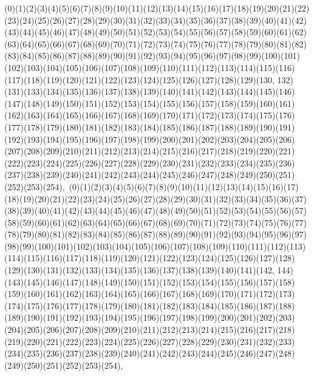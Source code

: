 \documentclass[12pt]{article}
\begin{document}
{(0)(1)(2)(3)(4)(5)(6)(7)(8)(9)(10)(11)(12)(13)(14)(15)(16)(17)(18)(19)(20)(21)(22)(23)(24)(25)(26)(27)(28)(29)(30)(31)(32)(33)(34)(35)(36)(37)(38)(39)(40)(41)(42)(43)(44)(45)(46)(47)(48)(49)(50)(51)(52)(53)(54)(55)(56)(57)(58)(59)(60)(61)(62)(63)(64)(65)(66)(67)(68)(69)(70)(71)(72)(73)(74)(75)(76)(77)(78)(79)(80)(81)(82)(83)(84)(85)(86)(87)(88)(89)(90)(91)(92)(93)(94)(95)(96)(97)(98)(99)(100)(101)(102)(103)(104)(105)(106)(107)(108)(109)(110)(111)(112)(113)(114)(115)(116)(117)(118)(119)(120)(121)(122)(123)(124)(125)(126)(127)(128)(129)(130, 132)(131)(133)(134)(135)(136)(137)(138)(139)(140)(141)(142)(143)(144)(145)(146)(147)(148)(149)(150)(151)(152)(153)(154)(155)(156)(157)(158)(159)(160)(161)(162)(163)(164)(165)(166)(167)(168)(169)(170)(171)(172)(173)(174)(175)(176)(177)(178)(179)(180)(181)(182)(183)(184)(185)(186)(187)(188)(189)(190)(191)(192)(193)(194)(195)(196)(197)(198)(199)(200)(201)(202)(203)(204)(205)(206)(207)(208)(209)(210)(211)(212)(213)(214)(215)(216)(217)(218)(219)(220)(221)(222)(223)(224)(225)(226)(227)(228)(229)(230)(231)(232)(233)(234)(235)(236)(237)(238)(239)(240)(241)(242)(243)(244)(245)(246)(247)(248)(249)(250)(251)(252)(253)(254)$
, 
$
(0)(1)(2)(3)(4)(5)(6)(7)(8)(9)(10)(11)(12)(13)(14)(15)(16)(17)(18)(19)(20)(21)(22)(23)(24)(25)(26)(27)(28)(29)(30)(31)(32)(33)(34)(35)(36)(37)(38)(39)(40)(41)(42)(43)(44)(45)(46)(47)(48)(49)(50)(51)(52)(53)(54)(55)(56)(57)(58)(59)(60)(61)(62)(63)(64)(65)(66)(67)(68)(69)(70)(71)(72)(73)(74)(75)(76)(77)(78)(79)(80)(81)(82)(83)(84)(85)(86)(87)(88)(89)(90)(91)(92)(93)(94)(95)(96)(97)(98)(99)(100)(101)(102)(103)(104)(105)(106)(107)(108)(109)(110)(111)(112)(113)(114)(115)(116)(117)(118)(119)(120)(121)(122)(123)(124)(125)(126)(127)(128)(129)(130)(131)(132)(133)(134)(135)(136)(137)(138)(139)(140)(141)(142, 144)(143)(145)(146)(147)(148)(149)(150)(151)(152)(153)(154)(155)(156)(157)(158)(159)(160)(161)(162)(163)(164)(165)(166)(167)(168)(169)(170)(171)(172)(173)(174)(175)(176)(177)(178)(179)(180)(181)(182)(183)(184)(185)(186)(187)(188)(189)(190)(191)(192)(193)(194)(195)(196)(197)(198)(199)(200)(201)(202)(203)(204)(205)(206)(207)(208)(209)(210)(211)(212)(213)(214)(215)(216)(217)(218)(219)(220)(221)(222)(223)(224)(225)(226)(227)(228)(229)(230)(231)(232)(233)(234)(235)(236)(237)(238)(239)(240)(241)(242)(243)(244)(245)(246)(247)(248)(249)(250)(251)(252)(253)(254)$
, 
$
}
\end{document}
